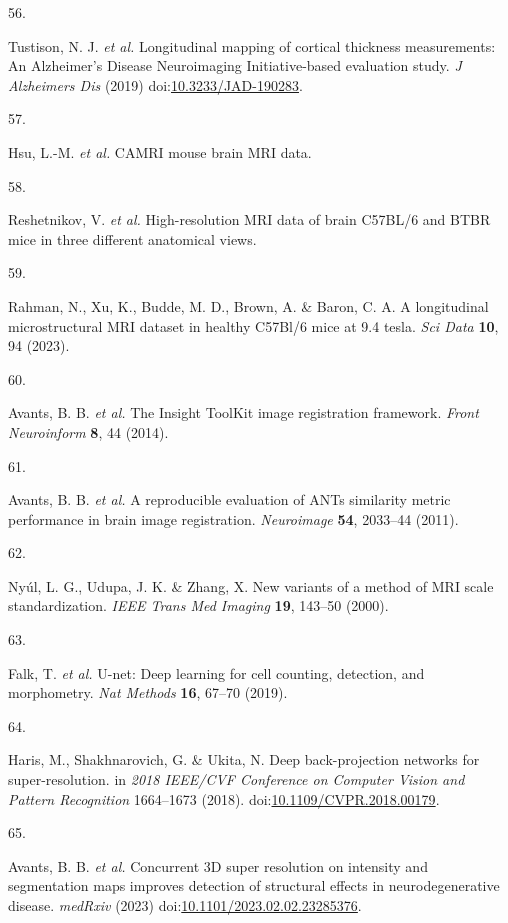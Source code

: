 \documentclass[
  12pt,
]{article}
\newlength{\cslhangindent}
\newlength{\csllabelwidth}
\newenvironment{CSLReferences}[2] %
 {%
  \setlength{\parindent}{0pt}
  \ifodd #1 \everypar{\setlength{\hangindent}{\cslhangindent}}\ignorespaces\fi
  \ifnum #2 > 0
  \setlength{\parskip}{#2\baselineskip}
  \fi
 }%
 {}
\newcommand{\CSLLeftMargin}[1]{\parbox[t]{\csllabelwidth}{#1}}
\newcommand{\CSLRightInline}[1]{\parbox[t]{\linewidth - \csllabelwidth}{#1}\break}
\begin{document}
\begin{CSLReferences}{0}{0}
\leavevmode{}%
\CSLLeftMargin{56. }
\CSLRightInline{Tustison, N. J. \emph{et al.} Longitudinal mapping of
cortical thickness measurements: An {A}lzheimer's {D}isease
{N}euroimaging {I}nitiative-based evaluation study. \emph{J Alzheimers
Dis} (2019)
doi:\href{https://doi.org/10.3233/JAD-190283}{10.3233/JAD-190283}.}

\leavevmode{}%
\CSLLeftMargin{57. }
\CSLRightInline{Hsu, L.-M. \emph{et al.} CAMRI mouse brain MRI data.}

\leavevmode{}%
\CSLLeftMargin{58. }
\CSLRightInline{Reshetnikov, V. \emph{et al.} High-resolution MRI data
of brain C57BL/6 and BTBR mice in three different anatomical views.}

\leavevmode{}%
\CSLLeftMargin{59. }
\CSLRightInline{Rahman, N., Xu, K., Budde, M. D., Brown, A. \& Baron, C.
A. A longitudinal microstructural MRI dataset in healthy C57Bl/6 mice at
9.4 tesla. \emph{Sci Data} \textbf{10}, 94 (2023).}

\leavevmode{}%
\CSLLeftMargin{60. }
\CSLRightInline{Avants, B. B. \emph{et al.} The {Insight} {ToolKit}
image registration framework. \emph{Front Neuroinform} \textbf{8}, 44
(2014).}

\leavevmode{}%
\CSLLeftMargin{61. }
\CSLRightInline{Avants, B. B. \emph{et al.} A reproducible evaluation of
ANTs similarity metric performance in brain image registration.
\emph{Neuroimage} \textbf{54}, 2033--44 (2011).}

\leavevmode{}%
\CSLLeftMargin{62. }
\CSLRightInline{Nyúl, L. G., Udupa, J. K. \& Zhang, X. New variants of a
method of MRI scale standardization. \emph{IEEE Trans Med Imaging}
\textbf{19}, 143--50 (2000).}

\leavevmode{}%
\CSLLeftMargin{63. }
\CSLRightInline{Falk, T. \emph{et al.} U-net: Deep learning for cell
counting, detection, and morphometry. \emph{Nat Methods} \textbf{16},
67--70 (2019).}

\leavevmode{}%
\CSLLeftMargin{64. }
\CSLRightInline{Haris, M., Shakhnarovich, G. \& Ukita, N. Deep
back-projection networks for super-resolution. in \emph{2018 {IEEE/CVF}
{C}onference on {C}omputer {V}ision and {P}attern {R}ecognition}
1664--1673 (2018).
doi:\href{https://doi.org/10.1109/CVPR.2018.00179}{10.1109/CVPR.2018.00179}.}

\leavevmode{}%
\CSLLeftMargin{65. }
\CSLRightInline{Avants, B. B. \emph{et al.} Concurrent 3D super
resolution on intensity and segmentation maps improves detection of
structural effects in neurodegenerative disease. \emph{medRxiv} (2023)
doi:\href{https://doi.org/10.1101/2023.02.02.23285376}{10.1101/2023.02.02.23285376}.}

\end{CSLReferences}
\end{document}
